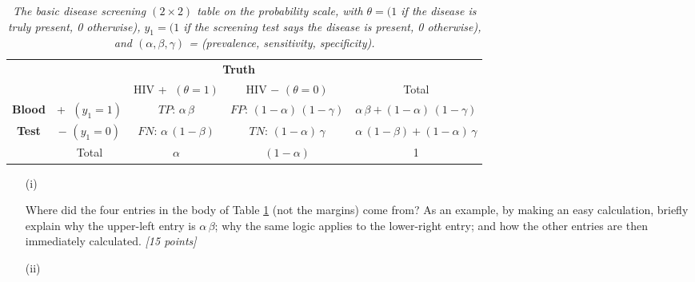 \documentclass[12pt]{article}
\begin{document}
\begin{itemize}
\begin{table}[t!]

\centering

\caption{\textit{The basic disease screening $( 2 \times 2 )$ table on the probability scale, with $\theta = ( 1$ if the disease is truly present, 0 otherwise), $y_1 = ( 1$ if the screening test says the disease is present, 0 otherwise), and $( \alpha, \beta, \gamma )$ = (prevalence, sensitivity, specificity).}}

\label{t:basic-screening-table}

\bigskip

\begin{tabular}{cc|c|c|c}

& \multicolumn{1}{c}{} & \multicolumn{2}{c}{\textbf{Truth}} \\

& \multicolumn{1}{c}{} & \multicolumn{1}{c}{HIV \textcircled{+} $( \theta = 1 )$} & \multicolumn{1}{c}{HIV \textcircled{$-$} $( \theta = 0 )$}  & Total \\ \cline{3-4}

\textbf{Blood} & \textcircled{+} $( y_1 = 1 )$ & $TP \! : \, \alpha \, \beta$ & $FP \! : \, ( 1 - \alpha ) \, ( 1 - \gamma )$ & $\alpha \, \beta + ( 1 - \alpha ) \, ( 1 - \gamma )$ \\ \cline{3-4}

\textbf{Test} & \textcircled{$-$} $( y_1 = 0 )$ & $FN \! : \, \alpha \, ( 1 - \beta )$ & $TN \! : \, ( 1 - \alpha ) \, \gamma$ & $\alpha \, ( 1 - \beta ) + ( 1 - \alpha ) \, \gamma$ \\ \cline{3-4}

& \multicolumn{1}{c}{Total} & \multicolumn{1}{c}{$\alpha$} & \multicolumn{1}{c}{$( 1 - \alpha )$} & 1

\end{tabular}

\end{table}

\begin{itemize}

\item[(i)]

Where did the four entries in the body of Table \ref{t:basic-screening-table} (not the margins) come from? As an example, by making an easy calculation, briefly explain why the upper-left entry is  $\alpha \, \beta$; why the same logic applies to the lower-right entry; and how the other entries are then immediately calculated. \textit{[15 points]}

\item[(ii)]


\end{itemize}
\end{itemize}
\end{document}
